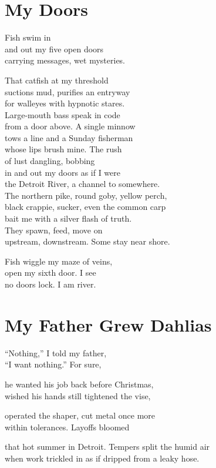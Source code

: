 \documentclass[twoside,10pt]{book}
\begin{document}
\clearpage
\section{My Doors}

Fish swim in\\
and out my five open doors\\
carrying messages, wet mysteries.

That catfish at my threshold\\
suctions mud, purifies an entryway\\
for walleyes with hypnotic stares.\\
Large-mouth bass speak in code\\
from a door above. A single minnow\\
tows a line and a Sunday fisherman\\
whose lips brush mine. The rush\\
of lust dangling, bobbing\\
in and out my doors as if I were\\
the Detroit River, a channel to somewhere.\\
The northern pike, round goby, yellow perch,\\
black crappie, sucker, even the common carp\\
bait me with a silver flash of truth.\\
They spawn, feed, move on\\
upstream, downstream. Some stay near shore.

Fish wiggle my maze of veins,\\
open my sixth door. I see\\
no doors lock. I am river.


\clearpage
\section{My Father Grew Dahlias}

``Nothing,'' I told my father,\\
``I want nothing.'' For sure,

he wanted his job back before Christmas,\\
wished his hands still tightened the vise,

operated the shaper, cut metal once more\\
within tolerances. Layoffs bloomed

that hot summer in Detroit. Tempers split the humid air\\
when work trickled in as if dripped from a leaky hose.
\end{document}
